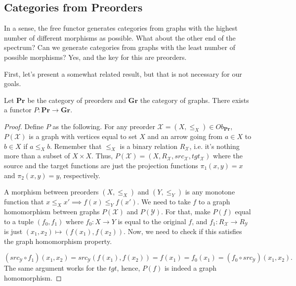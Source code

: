\subsection{Categories from Preorders}

In a  sense, the free functor generates categories from graphs with the
highest number of different morphisms as possible.
What about the other end of the spectrum? Can we generate categories from
graphs with the least number of possible morphisms? Yes, and the key for this are
preorders.

First, let's present a somewhat related result, but that is not necessary for our
goals.

\begin{proposition}
  Let $\mathbf{Pr}$ be the category of preorders and $\mathbf{Gr}$ the category of graphs.
  There exists a functor $P:\mathbf{Pr} \to \mathbf{Gr}$.
\end{proposition}
\begin{proof}
  Define $P$ as the following. For any preorder $\mathcal X=(X,\leq_X) \in Ob_\mathbf{Pr}$,
  $P(\mathcal X)$ is a graph with vertices equal to set $X$ and an arrow going from $a \in X$ to
  $b \in X$ if $a \leq_X b$. Remember that $\leq_X$ is a binary relation $R_\mathcal X$, i.e. it's nothing
  more than a subset of $X\times X$. Thus, $P(\mathcal X) = (X, R_\mathcal X, src_\mathcal X, tgt_\mathcal X)$
  where the source and the target functions are just the projection functions $\pi_1(x,y)= x$ and $\pi_2(x,y)=y$,
  respectively.

  A morphism between preorders $(X,\leq_X)$ and $(Y,\leq_Y)$ is any monotone function
  that $x \leq_X x' \implies f(x) \leq_Y f(x')$.
  We need to take $f$ to a graph
  homomorphism between graphs $P(\mathcal X)$ and $P(\mathcal Y)$. For that,
  make $P(f)$ equal to a tuple $(f_0, f_1)$ where $f_0:X \to Y$ is equal to the
  original $f$, and $f_1:R_\mathcal X \to R_\mathcal Y$ is just $(x_1,x_2)\mapsto (f(x_1), f(x_2))$.
  Now, we need to check if this satisfies the graph homomorphism property.

  \begin{displaymath}
    (src_\mathcal Y \circ f_1)(x_1,x_2) = src_\mathcal Y (f(x_1),f(x_2)) = f(x_1) = f_0 (x_1) =
    (f_0 \circ src_\mathcal Y)(x_1,x_2).
  \end{displaymath}
  The same argument works for the $tgt$, hence, $P(f)$ is indeed a graph homomorphism.
\end{proof}

